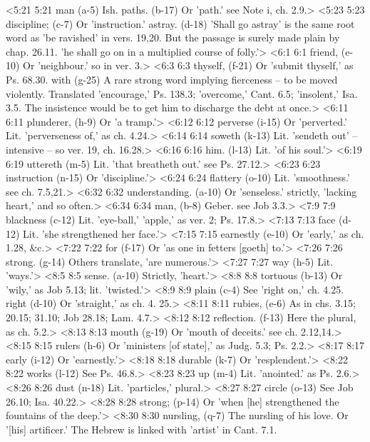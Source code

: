 <5:21 5:21  man (a-5)  Ish.
  paths. (b-17)  Or 'path.' see Note i, ch. 2.9.>
<5:23 5:23  discipline; (c-7)  Or 'instruction.'
  astray. (d-18)  'Shall go astray' is the same root word as 'be ravished' in  vers. 19,20. But the passage is surely made plain by chap. 26.11. 'he shall go on in a multiplied course of folly.'>
<6:1 6:1  friend, (e-10)  Or 'neighbour.' so in ver. 3.>
<6:3 6:3  thyself, (f-21)  Or 'submit thyself,' as Ps. 68.30.
  with (g-25)  A rare strong word implying fierceness -- to be moved  violently. Translated 'encourage,' Ps. 138.3; 'overcome,' Cant.  6.5; 'insolent,' Isa. 3.5. The insistence would be to get him  to discharge the debt at once.>
<6:11 6:11  plunderer, (h-9)  Or 'a tramp.'>
<6:12 6:12  perverse (i-15)  Or 'perverted.' Lit. 'perverseness of,' as ch. 4.24.>
<6:14 6:14  soweth (k-13)  Lit. 'sendeth out' -- intensive -- so ver. 19, ch. 16.28.>
<6:16 6:16  him. (l-13)  Lit. 'of his soul.'>
<6:19 6:19  uttereth (m-5)  Lit. 'that breatheth out.' see Ps. 27.12.>
<6:23 6:23  instruction (n-15)  Or 'discipline.'>
<6:24 6:24  flattery (o-10)  Lit. 'smoothness.' see ch. 7.5,21.>
<6:32 6:32  understanding. (a-10)  Or 'senseless.' strictly, 'lacking heart,' and so often.>
<6:34 6:34  man, (b-8)  Geber. see Job 3.3.>
<7:9 7:9  blackness (c-12)  Lit. 'eye-ball,' 'apple,' as ver. 2; Ps. 17.8.>
<7:13 7:13  face (d-12)  Lit. 'she strengthened her face.'>
<7:15 7:15  earnestly (e-10)  Or 'early,' as ch. 1.28, &c.>
<7:22 7:22  for (f-17)  Or 'as one in fetters [goeth] to.'>
<7:26 7:26  strong. (g-14)  Others translate, 'are numerous.'>
<7:27 7:27  way (h-5)  Lit. 'ways.'>
<8:5 8:5  sense. (a-10)  Strictly, 'heart.'>
<8:8 8:8  tortuous (b-13)  Or 'wily,' as Job 5.13; lit. 'twisted.'>
<8:9 8:9  plain (c-4)  See 'right on,' ch. 4.25.
  right (d-10)  Or 'straight,' as ch. 4. 25.>
<8:11 8:11  rubies, (e-6)  As in chs. 3.15; 20.15; 31.10; Job 28.18; Lam. 4.7.>
<8:12 8:12  reflection. (f-13)  Here the plural, as ch. 5.2.>
<8:13 8:13  mouth (g-19)  Or 'mouth of deceits.' see ch. 2.12,14.>
<8:15 8:15  rulers (h-6)  Or 'ministers [of state],' as Judg. 5.3; Ps. 2.2.>
<8:17 8:17  early (i-12)  Or 'earnestly.'>
<8:18 8:18  durable (k-7)  Or 'resplendent.'>
<8:22 8:22  works (l-12)  See Ps. 46.8.>
<8:23 8:23  up (m-4)  Lit. 'anointed.' as Ps. 2.6.>
<8:26 8:26  dust (n-18)  Lit. 'particles,' plural.>
<8:27 8:27  circle (o-13)  See Job 26.10; Isa. 40.22.>
<8:28 8:28  strong; (p-14)  Or 'when [he] strengthened the fountains of the deep.'>
<8:30 8:30  nursling, (q-7)  The nursling of his love. Or '[his] artificer.' The Hebrew is  linked with 'artist' in Cant. 7.1.

